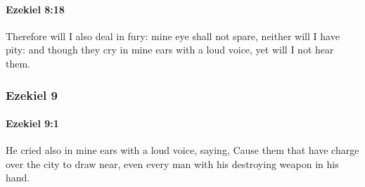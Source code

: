 		\paragraph{Ezekiel 8:18} %
			\label{EZEKIEL-8-18}

			Therefore will I also deal in fury: mine eye shall not spare, neither will I have pity: and though they cry in mine ears with a loud voice, yet will I not hear them.

	\subsubsection{Ezekiel 9} %
		\label{EZEKIEL-9}

		\paragraph{Ezekiel 9:1} %
			\label{EZEKIEL-9-1}

			He cried also in mine ears with a loud voice, saying, Cause them that have charge over the city to draw near, even every man with his destroying weapon in his hand.

